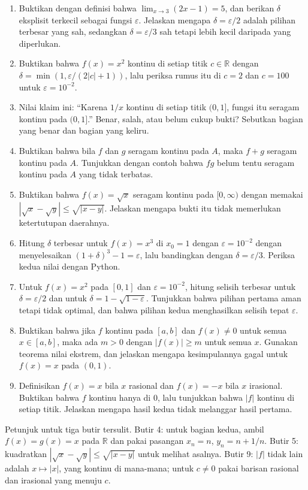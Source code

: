 \begin{latihan}
\begin{enumerate}
  \item Buktikan dengan definisi bahwa $\lim_{x\to 3}(2x-1)=5$, dan berikan $\delta$
        eksplisit terkecil sebagai fungsi $\varepsilon$. Jelaskan mengapa
        $\delta=\varepsilon/2$ adalah pilihan terbesar yang sah, sedangkan
        $\delta=\varepsilon/3$ sah tetapi lebih kecil daripada yang diperlukan.
  \item Buktikan bahwa $f(x)=x^{2}$ kontinu di setiap titik $c\in\mathbb{R}$ dengan
        $\delta=\min(1,\varepsilon/(2|c|+1))$, lalu periksa rumus itu di $c=2$ dan
        $c=100$ untuk $\varepsilon=10^{-2}$.
  \item Nilai klaim ini: ``Karena $1/x$ kontinu di setiap titik $(0,1]$, fungsi itu
        seragam kontinu pada $(0,1]$.'' Benar, salah, atau belum cukup bukti? Sebutkan
        bagian yang benar dan bagian yang keliru.
  \item Buktikan bahwa bila $f$ dan $g$ seragam kontinu pada $A$, maka $f+g$ seragam
        kontinu pada $A$. Tunjukkan dengan contoh bahwa $fg$ belum tentu seragam
        kontinu pada $A$ yang tidak terbatas.
  \item Buktikan bahwa $f(x)=\sqrt{x}$ seragam kontinu pada $[0,\infty)$ dengan
        memakai $|\sqrt{x}-\sqrt{y}|\le\sqrt{|x-y|}$. Jelaskan mengapa bukti itu tidak
        memerlukan ketertutupan daerahnya.
  \item Hitung $\delta$ terbesar untuk $f(x)=x^{3}$ di $x_{0}=1$ dengan
        $\varepsilon=10^{-2}$ dengan menyelesaikan $(1+\delta)^{3}-1=\varepsilon$, lalu
        bandingkan dengan $\delta=\varepsilon/3$. Periksa kedua nilai dengan Python.
  \item Untuk $f(x)=x^{2}$ pada $[0,1]$ dan $\varepsilon=10^{-2}$, hitung selisih
        terbesar untuk $\delta=\varepsilon/2$ dan untuk $\delta=1-\sqrt{1-\varepsilon}$.
        Tunjukkan bahwa pilihan pertama aman tetapi tidak optimal, dan bahwa pilihan
        kedua menghasilkan selisih tepat $\varepsilon$.
  \item Buktikan bahwa jika $f$ kontinu pada $[a,b]$ dan $f(x)\neq 0$ untuk semua
        $x\in[a,b]$, maka ada $m>0$ dengan $|f(x)|\ge m$ untuk semua $x$. Gunakan
        teorema nilai ekstrem, dan jelaskan mengapa kesimpulannya gagal untuk
        $f(x)=x$ pada $(0,1)$.
  \item Definisikan $f(x)=x$ bila $x$ rasional dan $f(x)=-x$ bila $x$ irasional.
        Buktikan bahwa $f$ kontinu hanya di $0$, lalu tunjukkan bahwa $|f|$ kontinu di
        setiap titik. Jelaskan mengapa hasil kedua tidak melanggar hasil pertama.
\end{enumerate}

Petunjuk untuk tiga butir tersulit. Butir 4: untuk bagian kedua, ambil $f(x)=g(x)=x$
pada $\mathbb{R}$ dan pakai pasangan $x_{n}=n$, $y_{n}=n+1/n$. Butir 5: kuadratkan
$|\sqrt{x}-\sqrt{y}|\le\sqrt{|x-y|}$ untuk melihat asalnya. Butir 9: $|f|$ tidak lain
adalah $x\mapsto|x|$, yang kontinu di mana-mana; untuk $c\neq0$ pakai barisan rasional
dan irasional yang menuju $c$.
\end{latihan}

